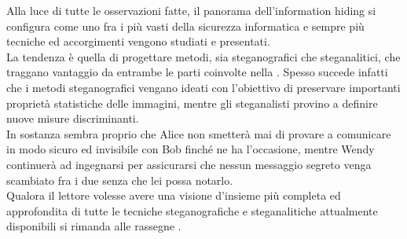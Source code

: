Alla luce di tutte le osservazioni fatte, il panorama dell'information hiding si configura come uno fra i più vasti della sicurezza informatica \cite{warfare} e sempre più tecniche ed accorgimenti vengono studiati e presentati.\\La tendenza è quella di progettare metodi, sia steganografici che steganalitici, che traggano vantaggio da entrambe le parti coinvolte nella  \cite{survey, survey2, warfare}. Spesso succede infatti che i metodi steganografici vengano ideati con l'obiettivo di preservare importanti proprietà statistiche delle immagini, mentre gli steganalisti provino a definire nuove misure discriminanti.\\In sostanza sembra proprio che Alice non smetterà mai di provare a comunicare in modo sicuro ed invisibile con Bob finché ne ha l'occasione, mentre Wendy continuerà ad ingegnarsi per assicurarsi che nessun messaggio segreto venga scambiato fra i due senza che lei possa notarlo.\\
Qualora il lettore volesse avere una visione d'insieme più completa ed approfondita di tutte le tecniche steganografiche e steganalitiche attualmente disponibili si rimanda alle rassegne \cite{survey, survey2, warfare}.
\appendix